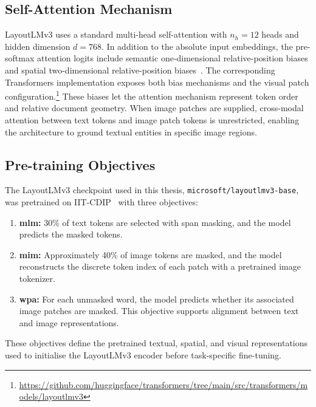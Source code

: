 \subsection{Self-Attention Mechanism}
\label{sec:self-attention}

LayoutLMv3 uses a standard multi-head self-attention with $n_h = 12$ heads and
hidden dimension $d = 768$. In addition to the absolute input embeddings, the
pre-softmax attention logits include semantic one-dimensional relative-position
biases and spatial two-dimensional relative-position biases~\cite{layoutlmv3}.
The corresponding Transformers implementation exposes both bias mechanisms
and the visual patch
configuration.\footnote{\url{https://github.com/huggingface/transformers/tree/main/src/transformers/models/layoutlmv3}}
These biases let the attention mechanism represent token order and relative
document geometry.
When image patches are supplied, cross-modal attention between text tokens and
image patch tokens is unrestricted, enabling the architecture to ground textual
entities in specific image regions.

\subsection{Pre-training Objectives}
\label{sec:pretraining-objectives}

The LayoutLMv3 checkpoint used in this thesis,
\texttt{microsoft/layoutlmv3-base}, was pretrained on
IIT-CDIP~\cite{iitcdip,layoutlmv3} with three objectives:

\begin{enumerate}
  \item \textbf{\Gls{mlm}:} 30\% of text tokens are
  selected with span masking, and the model predicts the masked tokens.
  \item \textbf{\Gls{mim}:} Approximately 40\% of image
  tokens are masked, and the model reconstructs the discrete token index of
  each patch with a pretrained image tokenizer.
  \item \textbf{\Gls{wpa}:} For each unmasked word, the model
  predicts whether its associated image patches are masked. This objective
  supports alignment between text and image representations.
\end{enumerate}

These objectives define the pretrained textual, spatial, and visual
representations used to initialise the LayoutLMv3 encoder before task-specific
fine-tuning.


